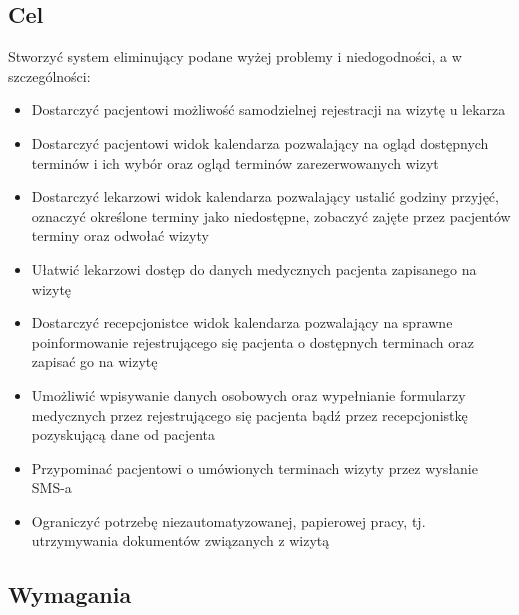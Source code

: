 \documentclass[10pt,a4paper]{article}
\begin{document}
\subsection{Cel}
Stworzyć system eliminujący podane wyżej problemy i niedogodności, a w szczególności:

\begin{itemize}
  \item Dostarczyć pacjentowi możliwość samodzielnej rejestracji na wizytę u lekarza
  \item Dostarczyć pacjentowi widok kalendarza pozwalający na ogląd dostępnych terminów i ich wybór oraz ogląd terminów zarezerwowanych wizyt
  \item Dostarczyć lekarzowi widok kalendarza pozwalający ustalić godziny przyjęć, oznaczyć określone terminy jako niedostępne, zobaczyć zajęte przez pacjentów terminy oraz odwołać wizyty
  \item Ułatwić lekarzowi dostęp do danych medycznych pacjenta zapisanego na wizytę
  \item Dostarczyć recepcjonistce widok kalendarza pozwalający na sprawne poinformowanie rejestrującego się pacjenta o dostępnych terminach oraz zapisać go na wizytę
  \item Umożliwić wpisywanie danych osobowych oraz wypełnianie formularzy medycznych przez rejestrującego się pacjenta bądź przez recepcjonistkę pozyskującą dane od pacjenta
  \item Przypominać pacjentowi o umówionych terminach wizyty przez wysłanie SMS-a
  \item Ograniczyć potrzebę niezautomatyzowanej, papierowej pracy, tj. utrzymywania dokumentów związanych z wizytą
\end{itemize}

\subsection{Wymagania}
\end{document}
